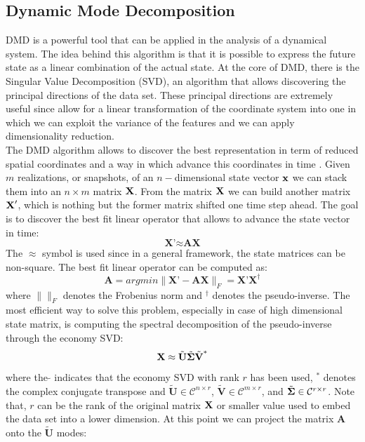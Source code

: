 \documentclass[]{article}
\begin{document}
\subsection{Dynamic Mode Decomposition}
DMD is a powerful tool that can be applied in the analysis of a dynamical system. The idea behind this algorithm is that it is possible to express the future state as a linear combination of the actual state. At the core of DMD, there is the Singular Value Decomposition (SVD), an algorithm that allows discovering the principal directions of the data set. These principal directions are extremely useful since allow for a linear transformation of the coordinate system into one in which we can exploit the variance of the features and we can apply dimensionality reduction.\\
The DMD algorithm allows to discover the best representation in term of reduced spatial coordinates and a way in which advance this coordinates in time \cite{brunton2019}. Given $m$ realizations, or snapshots, of an $n-$dimensional state vector $\textbf x$ we can stack them into an $n \times m$ matrix $\textbf X$. From the matrix $\textbf X$ we can build another matrix $\textbf X'$, which is nothing but the former matrix shifted one time step ahead. The goal is to discover the best fit linear operator that allows to advance the state vector in time:
\begin{equation}\label{bestfit}
    \textbf{X'} \approx \textbf{A} \textbf{X}
\end{equation}
The $\approx$ symbol is used since in a general framework, the state matrices can be non-square. The best fit linear operator can be computed as:
\begin{equation}\label{bestfit}
    \textbf{A} = argmin \parallel \textbf{X'} - \textbf{A} \textbf{X} \parallel_F = \textbf{X'} \textbf{X}^\dagger 
\end{equation}
where $\parallel \parallel_F$ denotes the Frobenius norm and $^\dagger$ denotes the pseudo-inverse. The most efficient way to solve this problem, especially in case of high dimensional state matrix, is computing the spectral decomposition of the pseudo-inverse through the economy SVD:
\begin{equation}\label{svd}
    \textbf{X} \approx \tilde{\textbf{U}} \tilde{\bf\Sigma} \tilde{\textbf{V}}^*
\end{equation}
where the $\tilde{}$ indicates that the economy SVD with rank $r$ has been used, $^*$ denotes the complex conjugate transpose and $\tilde{\textbf{U}} \in \mathcal{C}^{n \times r}$, $\tilde{\textbf{V}} \in \mathcal{C}^{m \times r}$, and $\tilde{\bf{\Sigma}} \in \mathcal{C}^{r \times r}$. Note that, $r$ can be the rank of the original matrix $\textbf X$ or smaller value used to embed the data set into a lower dimension. At this point we can project the matrix $\textbf{A}$ onto the $\tilde{\textbf{U}}$ modes:
\end{document}
